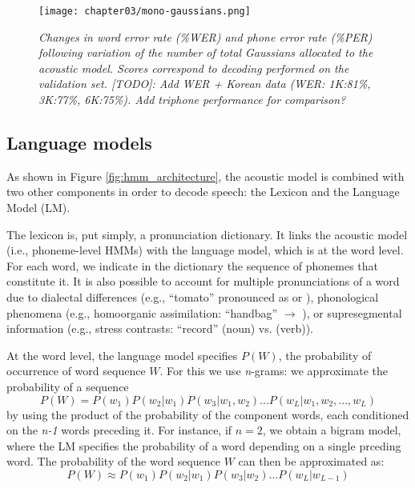  
\begin{figure}[htb]
\centering
\texttt{[image: chapter03/mono-gaussians.png]}
\caption{\textit{Changes in word error rate (\%WER) and phone error rate (\%PER) following variation of the number of total Gaussians allocated to the acoustic model. Scores correspond to decoding performed on the validation set. {\color{red}[TODO]: Add WER + Korean data (WER: 1K:81\%, 3K:77\%, 6K:75\%). Add triphone performance for comparison?}}}
\label{fig:hmm_gaussians}
\end{figure}

\subsection{Language models}
As shown in Figure \ref{fig:hmm_architecture}, the acoustic model is combined with two other components in order to decode speech: the Lexicon and the Language Model (LM).

The lexicon is, put simply, a pronunciation dictionary. It links the acoustic model (i.e., phoneme-level HMMs) with the language model, which is at the word level. For each word, we indicate in the dictionary the sequence of phonemes that constitute it. It is also possible to account for multiple pronunciations of a word due to dialectal differences (e.g., ``tomato'' pronounced as  or ), phonological phenomena (e.g., homoorganic assimilation: ``handbag''  $\rightarrow$ ), or supresegmental information (e.g., stress contrasts: ``record''  (noun) vs.  (verb)).

At the word level, the language model specifies $P(W)$, the probability of occurrence of word sequence $W$. For this we use \textit{n}-grams: we approximate the probability of a sequence
\begin{equation}
P(W) = P(w_{1})P(w_2|w_1)P(w_3 | w_1, w_2)...P(w_L | w_1, w_2, ..., w_L)
\end{equation}
by using the product of the probability of the component words, each conditioned on the \textit{n-1} words preceding it. For instance, if $n = 2$, we obtain a bigram model, where the LM specifies the probability of a word depending on a single prceding word. The probability of the word sequence $W$ can then be approximated as:    
\begin{equation}
P(W) \approx P(w_{1})P(w_2|w_1)P(w_3 | w_2)...P(w_L | w_{L-1})
\end{equation}

